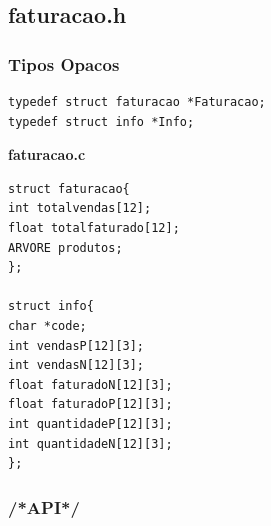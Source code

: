 \subsection{faturacao.h}

\subsubsection{Tipos Opacos}
\begin{Verbatim}
typedef struct faturacao *Faturacao;
typedef struct info *Info;
\end{Verbatim}

\textbf{faturacao.c}
\begin{verbatim}
struct faturacao{
int totalvendas[12];
float totalfaturado[12];
ARVORE produtos;
};

struct info{
char *code;
int vendasP[12][3];
int vendasN[12][3];
float faturadoN[12][3];
float faturadoP[12][3];
int quantidadeP[12][3];
int quantidadeN[12][3];
};
\end{verbatim}

\subsubsection{/*API*/}

